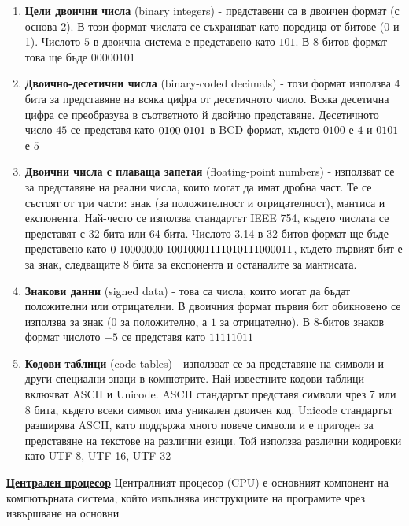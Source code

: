 \documentclass{article}
\begin{document}
\begin{enumerate}
    \item \textbf{Цели двоични числа} (binary integers) - представени са в двоичен формат (с основа 2). В този формат числата се съхраняват като
    поредица от битове (0 и 1). Числото $5$ в двоична система е представено като $101$. В $8$-битов формат това ще бъде $00000101$
    \item \textbf{Двоично-десетични числа} (binary-coded decimals) - този формат използва $4$ бита за представяне на всяка цифра от десетичното число.
    Всяка десетична цифра се преобразува в съответното й двойчно представяне. Десетичното число $45$ се представя като $0100 \hspace{0.1cm} 0101$
    в BCD формат, където $0100$ е $4$ и $0101$ е $5$
    \item \textbf{Двоични числа с плаваща запетая} (floating-point numbers) - използват се за представяне на реални числа, които могат да имат дробна
    част. Те се състоят от три части: знак (за положителност и отрицателност), мантиса и експонента. Най-често се използва стандартът IEEE 754,
    където числата се представят с 32-бита или 64-бита. Числото 3.14 в 32-битов формат ще бъде представено като $0 \hspace{0.1cm} 10000000
    \hspace{0.1cm} 10010001111010111000011$, където първият бит е за знак, следващите $8$ бита за експонента и останалите за мантисата.
    \item \textbf{Знакови данни} (signed data) - това са числа, които могат да бъдат положителни или отрицателни. В двоичния формат първия бит обикновено
    се използва за знак ($0$ за положително, а $1$ за отрицателно). В $8$-битов знаков формат числото $-5$ се представя като $11111011$
    \item \textbf{Кодови таблици} (code tables) - използват се за представяне на символи и други специални знаци в компютрите. Най-известните кодови таблици
    включват ASCII и Unicode. ASCII стандартът представя символи чрез 7 или 8 бита, където всеки символ има уникален двоичен код. Unicode стандартът
    разширява ASCII, като поддържа много повече символи и е пригоден за представяне на текстове на различни езици. Той използва различни кодировки
    като UTF-8, UTF-16, UTF-32 
\end{enumerate}
\textbf{\underline{Централен процесор}} \newline\newline
Централният процесор (CPU) е основният компонент на компютърната система, който изпълнява инструкциите на програмите чрез извършване на основни
\end{document}
